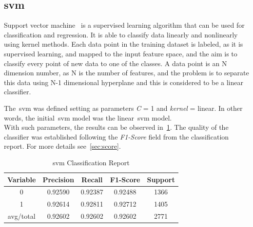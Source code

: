 \subsection{\acf{svm}}
Support vector machine~\cite{svm} is a supervised learning algorithm that can be used for classification and regression. It is able to classify data linearly and nonlinearly using kernel methods. Each data point in the training dataset is labeled, as it is supervised learning, and mapped to the input feature space, and the aim is to classify every point of new data to one of the classes. A data point is an N dimension number, as N is the number of features, and the problem is to separate this data using N-1 dimensional hyperplane and this is considered to be a linear classifier.\par
The~\ac{svm} was defined setting as parameters \textit{C} = 1 and \textit{kernel} = linear. In other words, the initial~\ac{svm} model was the linear~\ac{svm} model.\\
With such parameters, the results can be observed in~\cref{tab:sv1}. The quality of the classifier was established following the \textit{F1-Score} field from the classification report. For more details see~\cref{sec:score}. 

\begin{table}[h!]
	\centering
	\begin{tabular}{||c c c c c||} 
		\hline
		Variable & Precision & Recall & F1-Score & Support \\ [0.5ex] 
		\hline\hline
		0 & 0.92590 & 0.92387 & 0.92488 & 1366 \\ 
		1 & 0.92614 & 0.92811 & 0.92712 & 1405 \\
		avg/total & 0.92602 & 0.92602 & 0.92602 & 2771 \\
		[1ex] 
		\hline
	\end{tabular}
	\caption{\acl{svm} Classification Report}
	\label{tab:sv1}
\end{table}
